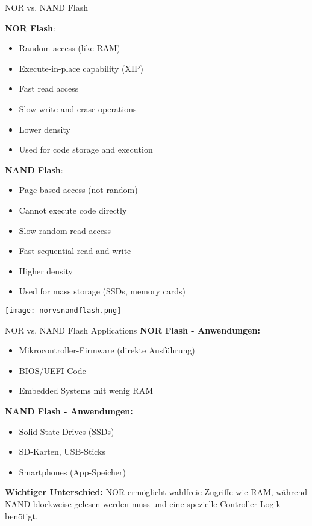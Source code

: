 \begin{definition}{NOR vs. NAND Flash}

\begin{minipage}{0.5\linewidth}
\textbf{NOR Flash}:
\begin{itemize}
    \item Random access (like RAM)
    \item Execute-in-place capability (XIP)
    \item Fast read access
    \item Slow write and erase operations
    \item Lower density
    \item Used for code storage and execution
\end{itemize}
\end{minipage}
\begin{minipage}{0.5\linewidth}
\textbf{NAND Flash}:
\begin{itemize}
    \item Page-based access (not random)
    \item Cannot execute code directly
    \item Slow random read access
    \item Fast sequential read and write
    \item Higher density
    \item Used for mass storage (SSDs, memory cards)
\end{itemize}
\end{minipage}

\texttt{[image: norvsnandflash.png]}
\end{definition}

\begin{example2}{NOR vs. NAND Flash Applications}
    \textbf{NOR Flash - Anwendungen:}
    \begin{itemize}
        \item Mikrocontroller-Firmware (direkte Ausführung)
        \item BIOS/UEFI Code
        \item Embedded Systems mit wenig RAM
    \end{itemize}
    
    \textbf{NAND Flash - Anwendungen:}
    \begin{itemize}
        \item Solid State Drives (SSDs)
        \item SD-Karten, USB-Sticks
        \item Smartphones (App-Speicher)
    \end{itemize}
    
    \textbf{Wichtiger Unterschied:}
    NOR ermöglicht wahlfreie Zugriffe wie RAM, während NAND blockweise gelesen werden muss und eine spezielle Controller-Logik benötigt.
\end{example2}

